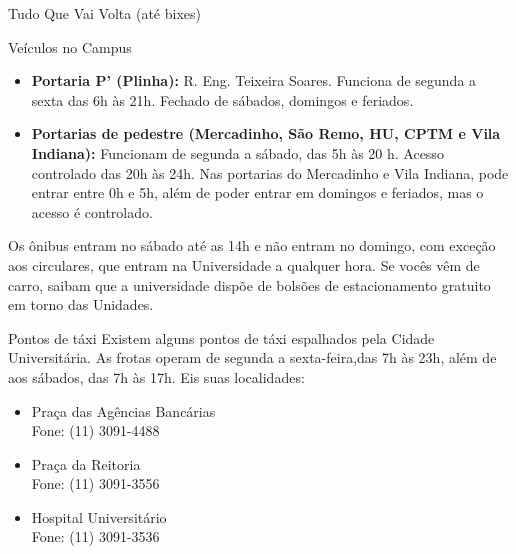 \begin{secao}{Tudo Que Vai Volta (até bixes)}
\begin{subsecao}{Veículos no Campus}
\begin{itemize}
  \item {\bf Portaria P' (Plinha):} R. Eng. Teixeira Soares. Funciona de segunda a
  sexta das 6h às 21h. Fechado de sábados, domingos e feriados.


  \item {\bf Portarias de pedestre (Mercadinho, São Remo, HU, CPTM e
      Vila Indiana):} Funcionam de segunda a sábado, das 5h às 20 h. Acesso controlado das 20h
      às 24h. Nas portarias do Mercadinho e Vila Indiana, pode entrar entre 0h e 5h, além
      de poder entrar em domingos e feriados, mas o acesso é controlado.

\end{itemize}

Os ônibus entram no sábado até as 14h e não entram no domingo, com exceção aos circulares, que entram na Universidade a qualquer hora. Se vocês vêm de carro, saibam que a universidade dispõe de bolsões de estacionamento
gratuito em torno das Unidades.

\end{subsecao}

\begin{subsecao}{Pontos de táxi}
Existem alguns pontos de táxi espalhados pela Cidade Universitária. As frotas
operam de segunda a sexta-feira,das 7h às 23h, além de aos sábados, das 7h às 17h.
Eis suas localidades:

\begin{itemize}
\item Praça das Agências Bancárias\\
Fone: (11) 3091-4488

\item Praça da Reitoria\\
Fone: (11) 3091-3556

\item Hospital Universitário\\
Fone: (11) 3091-3536
\end{itemize}
\end{subsecao}

\end{secao}
